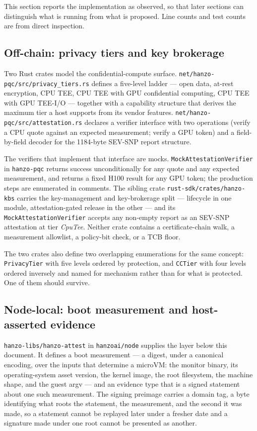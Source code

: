 \documentclass[11pt]{article}
\newcommand{\code}[1]{\texttt{#1}}
\begin{document}
This section reports the implementation as observed, so that later sections can distinguish what is
running from what is proposed. Line counts and test counts are from direct inspection.

\subsection{Off-chain: privacy tiers and key brokerage}

Two Rust crates model the confidential-compute surface.
\code{net/hanzo-pqc/src/privacy\_tiers.rs} defines a five-level ladder --- open data, at-rest
encryption, CPU TEE, CPU TEE with GPU confidential computing, CPU TEE with GPU TEE-I/O --- together
with a capability structure that derives the maximum tier a host supports from its vendor features.
\code{net/hanzo-pqc/src/attestation.rs} declares a verifier interface with two operations (verify a
CPU quote against an expected measurement; verify a GPU token) and a field-by-field decoder for the
1184-byte SEV-SNP report structure.

The verifiers that implement that interface are mocks. \code{MockAttestationVerifier} in
\code{hanzo-pqc} returns success unconditionally for any quote and any expected measurement, and
returns a fixed H100 result for any GPU token; the production steps are enumerated in comments. The
sibling crate \code{rust-sdk/crates/hanzo-kbs} carries the key-management and key-brokerage split
--- lifecycle in one module, attestation-gated release in the other --- and its
\code{MockAttestationVerifier} accepts any non-empty report as an SEV-SNP attestation at tier
\emph{CpuTee}. Neither crate contains a certificate-chain walk, a measurement allowlist, a policy-bit
check, or a TCB floor.

The two crates also define two overlapping enumerations for the same concept: \code{PrivacyTier} with
five levels ordered by protection, and \code{CCTier} with four levels ordered inversely and named for
mechanism rather than for what is protected. One of them should survive.

\subsection{Node-local: boot measurement and host-asserted evidence}
\label{sec:hanzoattest}

\code{hanzo-libs/hanzo-attest} in \code{hanzoai/node} supplies the layer below this document. It
defines a boot measurement --- a digest, under a canonical encoding, over the inputs that determine a
microVM: the monitor binary, its operating-system asset version, the kernel image, the root
filesystem, the machine shape, and the guest argv --- and an evidence type that is a signed statement
about one such measurement. The signing preimage carries a domain tag, a byte identifying what roots
the statement, the measurement, and the second it was made, so a statement cannot be replayed later
under a fresher date and a signature made under one root cannot be presented as another.
\end{document}
